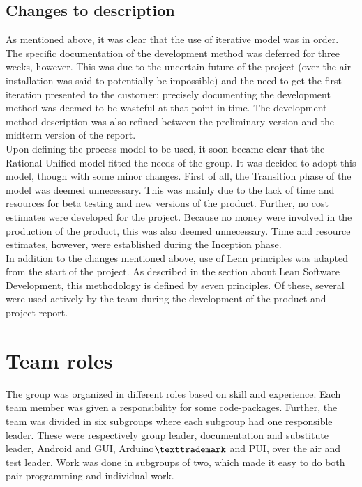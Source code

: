 \subsection{Changes to description} 
As mentioned above, it was clear that the use of iterative model was in order. The specific documentation of the development method was deferred for three weeks, however. This was due to the uncertain future of the project (over the air installation was said to potentially be impossible) and the need to get the first iteration presented to the customer; precisely documenting the development method was deemed to be wasteful at that point in time. The development method description was also refined between the preliminary version and the midterm version of the report. \\
\newline
Upon defining the process model to be used, it soon became clear that the Rational Unified model fitted the needs of the group. It was decided to adopt this model, though with some minor changes. First of all, the Transition phase of the model was deemed unnecessary. This was mainly due to the lack of time and resources for beta testing and new versions of the product. Further, no cost estimates were developed for the project. Because no money were involved in the production of the product, this was also deemed unnecessary. Time and resource estimates, however, were established during the Inception phase. \\
\newline
In addition to the changes mentioned above, use of Lean principles was adapted from the start of the project. As described in the section about Lean Software Development, this methodology is defined by seven principles. Of these, several were used actively by the team during the development of the product and project report. %

\section{Team roles}
The group was organized in different roles based on skill and experience. Each team member was given a responsibility for some code-packages. Further, the team was divided in six subgroups where each subgroup had one responsible leader. These were respectively group leader, documentation and substitute leader, Android and GUI, Arduino$\texttrademark$ and PUI, over the air and test leader. Work was done in subgroups of two, which made it easy to do both pair-programming and individual work.

